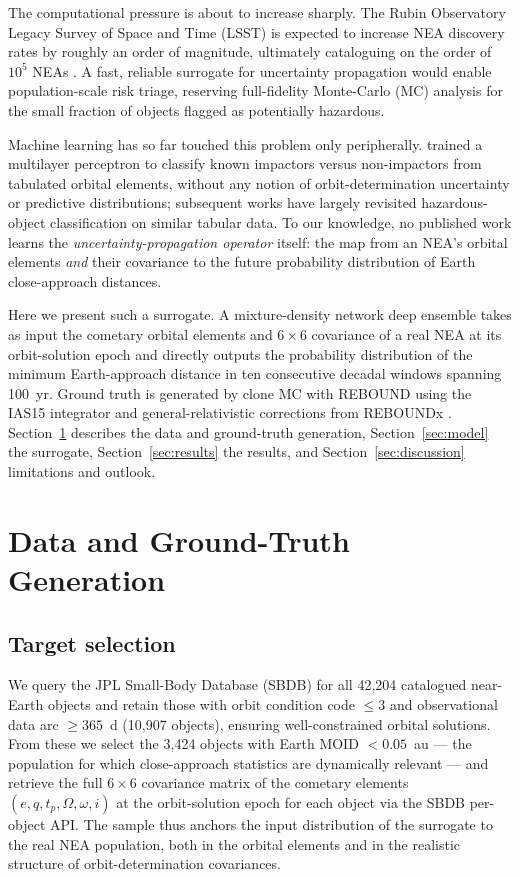 \documentclass[twocolumn]{aastex631}
\begin{document}
The computational pressure is about to increase sharply. The Rubin
Observatory Legacy Survey of Space and Time (LSST) is expected to increase
NEA discovery rates by roughly an order of magnitude, ultimately cataloguing
on the order of $10^5$ NEAs \citep{Jones2018, Ivezic2019}. A fast,
reliable surrogate for uncertainty propagation would enable population-scale
risk triage, reserving full-fidelity Monte-Carlo (MC) analysis for the small
fraction of objects flagged as potentially hazardous.

Machine learning has so far touched this problem only peripherally.
\citet{Hefele2020} trained a multilayer perceptron to classify known
impactors versus non-impactors from tabulated orbital elements, without any
notion of orbit-determination uncertainty or predictive distributions;
subsequent works have largely revisited hazardous-object classification on
similar tabular data. To our knowledge, no published work learns the
\emph{uncertainty-propagation operator} itself: the map from an NEA's
orbital elements \emph{and} their covariance to the future probability
distribution of Earth close-approach distances.

Here we present such a surrogate. A mixture-density network
\citep[MDN;][]{Bishop1994} deep ensemble \citep{Lakshminarayanan2017} takes
as input the cometary orbital elements and $6\times6$ covariance of a real
NEA at its orbit-solution epoch and directly outputs the probability
distribution of the minimum Earth-approach distance in ten consecutive
decadal windows spanning 100~yr. Ground truth is generated by clone MC with
REBOUND \citep{ReinLiu2012} using the IAS15 integrator
\citep{ReinSpiegel2015} and general-relativistic corrections from REBOUNDx
\citep{Tamayo2020reboundx}. Section~\ref{sec:data} describes the data and
ground-truth generation, Section~\ref{sec:model} the surrogate,
Section~\ref{sec:results} the results, and Section~\ref{sec:discussion}
limitations and outlook.

\section{Data and Ground-Truth Generation}\label{sec:data}

\subsection{Target selection}

We query the JPL Small-Body Database (SBDB) for all 42{,}204 catalogued
near-Earth objects and retain those with orbit condition code $\leq 3$ and
observational data arc $\geq 365$~d (10{,}907 objects), ensuring
well-constrained orbital solutions. From these we select the 3{,}424 objects
with Earth MOID $< 0.05$~au --- the population for which close-approach
statistics are dynamically relevant --- and retrieve the full $6\times6$
covariance matrix of the cometary elements $(e, q, t_p, \Omega, \omega, i)$
at the orbit-solution epoch for each object via the SBDB per-object API.
The sample thus anchors the input distribution of the surrogate to the real
NEA population, both in the orbital elements and in the realistic structure
of orbit-determination covariances.
\end{document}
